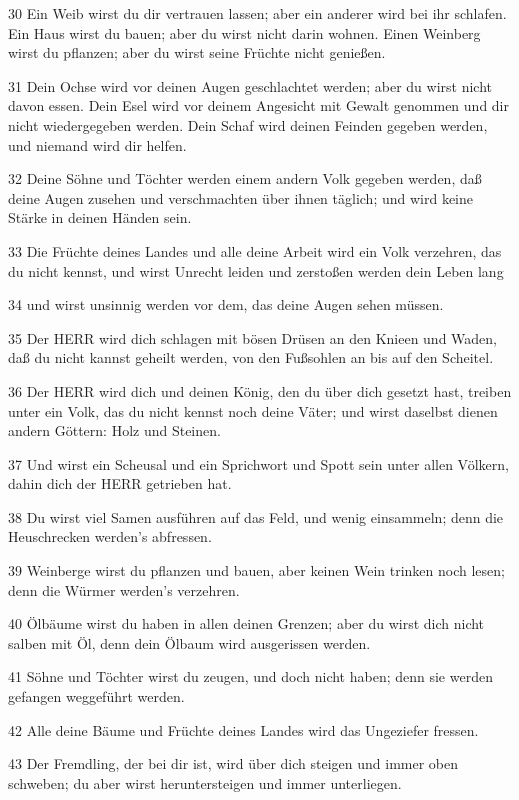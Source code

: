 \par 30 Ein Weib wirst du dir vertrauen lassen; aber ein anderer wird bei ihr schlafen. Ein Haus wirst du bauen; aber du wirst nicht darin wohnen. Einen Weinberg wirst du pflanzen; aber du wirst seine Früchte nicht genießen.
\par 31 Dein Ochse wird vor deinen Augen geschlachtet werden; aber du wirst nicht davon essen. Dein Esel wird vor deinem Angesicht mit Gewalt genommen und dir nicht wiedergegeben werden. Dein Schaf wird deinen Feinden gegeben werden, und niemand wird dir helfen.
\par 32 Deine Söhne und Töchter werden einem andern Volk gegeben werden, daß deine Augen zusehen und verschmachten über ihnen täglich; und wird keine Stärke in deinen Händen sein.
\par 33 Die Früchte deines Landes und alle deine Arbeit wird ein Volk verzehren, das du nicht kennst, und wirst Unrecht leiden und zerstoßen werden dein Leben lang
\par 34 und wirst unsinnig werden vor dem, das deine Augen sehen müssen.
\par 35 Der HERR wird dich schlagen mit bösen Drüsen an den Knieen und Waden, daß du nicht kannst geheilt werden, von den Fußsohlen an bis auf den Scheitel.
\par 36 Der HERR wird dich und deinen König, den du über dich gesetzt hast, treiben unter ein Volk, das du nicht kennst noch deine Väter; und wirst daselbst dienen andern Göttern: Holz und Steinen.
\par 37 Und wirst ein Scheusal und ein Sprichwort und Spott sein unter allen Völkern, dahin dich der HERR getrieben hat.
\par 38 Du wirst viel Samen ausführen auf das Feld, und wenig einsammeln; denn die Heuschrecken werden's abfressen.
\par 39 Weinberge wirst du pflanzen und bauen, aber keinen Wein trinken noch lesen; denn die Würmer werden's verzehren.
\par 40 Ölbäume wirst du haben in allen deinen Grenzen; aber du wirst dich nicht salben mit Öl, denn dein Ölbaum wird ausgerissen werden.
\par 41 Söhne und Töchter wirst du zeugen, und doch nicht haben; denn sie werden gefangen weggeführt werden.
\par 42 Alle deine Bäume und Früchte deines Landes wird das Ungeziefer fressen.
\par 43 Der Fremdling, der bei dir ist, wird über dich steigen und immer oben schweben; du aber wirst heruntersteigen und immer unterliegen.
